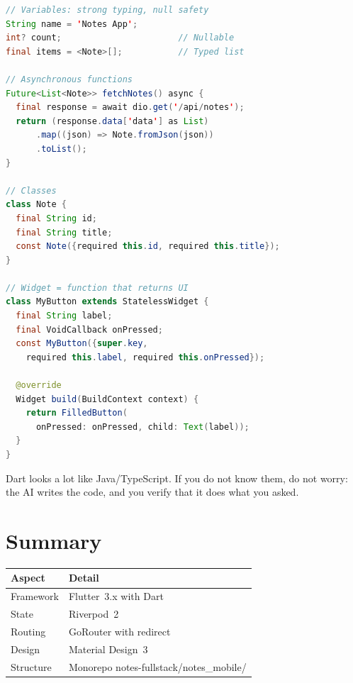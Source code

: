 \begin{lstlisting}[language=Java,title={Key Dart concepts}]
// Variables: strong typing, null safety
String name = 'Notes App';
int? count;                       // Nullable
final items = <Note>[];           // Typed list

// Asynchronous functions
Future<List<Note>> fetchNotes() async {
  final response = await dio.get('/api/notes');
  return (response.data['data'] as List)
      .map((json) => Note.fromJson(json))
      .toList();
}

// Classes
class Note {
  final String id;
  final String title;
  const Note({required this.id, required this.title});
}

// Widget = function that returns UI
class MyButton extends StatelessWidget {
  final String label;
  final VoidCallback onPressed;
  const MyButton({super.key,
    required this.label, required this.onPressed});

  @override
  Widget build(BuildContext context) {
    return FilledButton(
      onPressed: onPressed, child: Text(label));
  }
}
\end{lstlisting}

\begin{tipbox}
Dart looks a lot like Java/TypeScript. If you do not know them, do not worry: the AI writes the code, and you verify that it does what you asked.
\end{tipbox}

\section*{Summary}

\begin{center}
\begin{tabularx}{\textwidth}{l X}
\toprule
\textbf{Aspect} & \textbf{Detail} \\
\midrule
Framework & Flutter~3.x with Dart \\
State & Riverpod~2 \\
Routing & GoRouter with redirect \\
Design & Material Design~3 \\
Structure & Monorepo notes-fullstack/notes\_mobile/ \\
\bottomrule
\end{tabularx}
\end{center}
